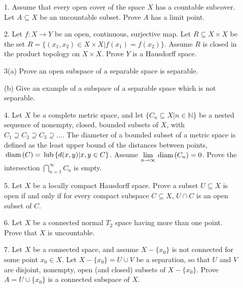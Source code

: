 \documentclass[12pt]{article}
\def\N{{\mathbb N}}
\def\diam{\hbox{\,diam\,}}
\def\lub{\hbox{\,lub\,}}
\def\ds{\displaystyle}
\begin{document}
\begin{description}

\item[] 1.
Assume that every open cover of the space $X$  has a countable subcover.
Let $A\subseteq X$ be an uncountable subset. Prove $A$ has a limit point.

\vspace{.1in}

\item[] 2.
Let $f:X\to Y$ be an open, continuous, surjective map. Let
$R\subseteq X\times X$ be the set $R=\{(x_1,x_2)\in X\times X|
f(x_1)=f(x_2)\}$.
Assume $R$ is closed in the product topology on $X\times X$.
Prove $Y$ is a Hausdorff space.

\vspace{.1in}

\item[] 3(a)
Prove an open subspace of a separable space is separable.

\item[\quad] (b)
Give an example of a subspace of a separable space which is not separable.

\vspace{.1in}

\item[] 4.
Let $X$ be a complete metric space, and let
$\{ C_n\subseteq X| n\in \N \}$
be a nested sequence of nonempty, closed, bounded subsets of $X$, with
$C_1\supseteq C_2\supseteq C_3\supseteq \dots$.
The diameter of a bounded subset of a  metric space is defined as the least
upper bound of the distances between points,
$\diam(C)=\lub\{ d(x,y) | x,y \in C \}$.
Assume $\ds\lim_{n\to\infty}\diam(C_n)=0$.
Prove the intersection $\ds\bigcap^\infty_{n=1}C_n$ is
 empty.

\vspace{.1in}

\item[] 5.
Let $X$ be a locally compact Hausdorff space.
Prove a subset $U\subseteq X$ is open if and only if for every compact
subspace $C\subseteq X$, $U\cap C$ is an open subset of $C$.

\vspace{.1in}

\item[] 6.
Let $X$ be a connected normal $T_2$ space having more than one point.
Prove that $X$ is uncountable.

\vspace{.1in}

\item[] 7.
Let $X$ be a connected space, and assume $X-\{x_0\}$ is not
connected for some point $x_0\in X$. Let $X-\{x_0\}=U\cup V$
be a separation, so that $U$ and $V$ are disjoint, nonempty, open
(and closed) subsets of $X-\{x_0\}$. Prove $A=U\cup \{x_0\}$
is a connected subspace of $X$.


\end{description}
\end{document}
